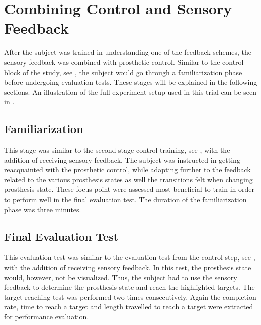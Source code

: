 \section{Combining Control and Sensory Feedback}
After the subject was trained in understanding one of the feedback schemes, the sensory feedback was combined with prosthetic control. Similar to the control block of the study, see , the subject would go through a familiarization phase before undergoing evaluation tests.  These stages will be explained in the following sections. An illustration of the full experiment setup used in this trial can be seen in .

\subsection{Familiarization}
This stage was similar to the second stage control training, see , with the addition of receiving sensory feedback. The subject was instructed in getting reacquainted with the prosthetic control, while adapting further to the feedback related to the various prosthesis states as well the transitions felt when changing prosthesis state. These focus point were assessed most beneficial to train in order to perform well in the final evaluation test. The duration of the familiarization phase was three minutes.

\subsection{Final Evaluation Test}
This evaluation test was similar to the evaluation test from the control step, see , with the addition of receiving sensory feedback. In this test, the prosthesis state would, however, not be visualized. Thus, the subject had to use the sensory feedback to determine the prosthesis state and reach the highlighted targets. The target reaching test was performed two times consecutively. Again the completion rate, time to reach a target and length travelled to reach a target were extracted for performance evaluation.

